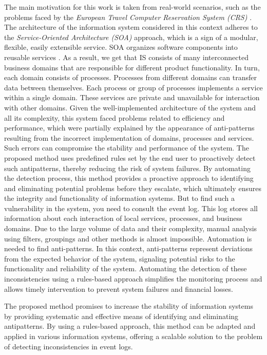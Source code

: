 \documentclass[12pt, times]{article}
\begin{document}
	\hspace*{5mm}The main motivation for this work is taken from real-world scenarios, such as the problems faced by the  \textit{European Travel Computer Reservation System (CRS)} \cite{crs}. The architecture of the information system considered in this context adheres to the \textit{Service-Oriented Architecture (SOA)} approach, which is a sign of a modular, flexible, easily extensible service. SOA organizes software components into reusable services \cite{soa}. As a result, we get that IS consists of many interconnected business domains that are responsible for different product functionality. In turn, each domain consists of processes. Processes from different domains can transfer data between themselves. Each process or group of processes implements a service within a single domain. These services are private and unavailable for interaction with other domains. Given the well-implemented architecture of the system and all its complexity, this system faced problems related to efficiency and performance, which were partially explained by the appearance of anti-patterns resulting from the incorrect implementation of domains, processes and services. Such errors can compromise the stability and performance of the system. The proposed method uses predefined rules set by the end user to proactively detect such antipatterns, thereby reducing the risk of system failures. By automating the detection process, this method provides a proactive approach to identifying and eliminating potential problems before they escalate, which ultimately ensures the integrity and functionality of information systems.
	But to find such a vulnerability in the system, you need to consult the event log. This log stores all information about each interaction of local services, processes, and business domains. Due to the large volume of data and their complexity, manual analysis using filters, groupings and other methods is almost impossible. Automation is needed to find anti-patterns. In this context, anti-patterns represent deviations from the expected behavior of the system, signaling potential risks to the functionality and reliability of the system. Automating the detection of these inconsistencies using a rules-based approach simplifies the monitoring process and allows timely intervention to prevent system failures and financial losses.
	
	\hspace*{5mm}The proposed method promises to increase the stability of information systems by providing systematic and effective means of identifying and eliminating antipatterns. By using a rules-based approach, this method can be adapted and applied in various information systems, offering a scalable solution to the problem of detecting inconsistencies in event logs.
	
\end{document}

